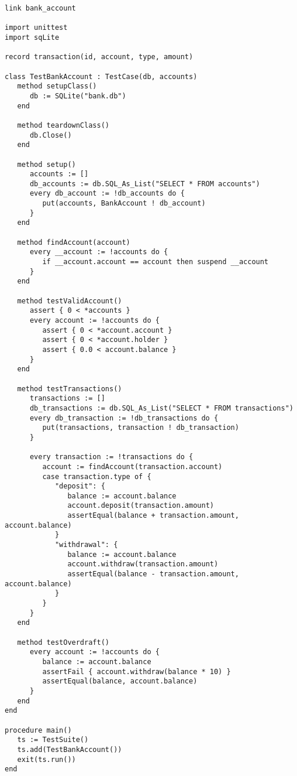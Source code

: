 \documentclass[letterpaper,12pt]{article}
\begin{document}
\bigskip{}
\begin{verbatim}
link bank_account

import unittest
import sqLite

record transaction(id, account, type, amount)

class TestBankAccount : TestCase(db, accounts)
   method setupClass()
      db := SQLite("bank.db")
   end

   method teardownClass()
      db.Close()
   end

   method setup()
      accounts := []
      db_accounts := db.SQL_As_List("SELECT * FROM accounts")
      every db_account := !db_accounts do {
         put(accounts, BankAccount ! db_account)
      }
   end

   method findAccount(account)
      every __account := !accounts do {
         if __account.account == account then suspend __account
      }
   end

   method testValidAccount()
      assert { 0 < *accounts }
      every account := !accounts do {
         assert { 0 < *account.account }
         assert { 0 < *account.holder }
         assert { 0.0 < account.balance }
      }
   end

   method testTransactions()
      transactions := []
      db_transactions := db.SQL_As_List("SELECT * FROM transactions")
      every db_transaction := !db_transactions do {
         put(transactions, transaction ! db_transaction)
      }

      every transaction := !transactions do {
         account := findAccount(transaction.account)
         case transaction.type of {
            "deposit": {
               balance := account.balance
               account.deposit(transaction.amount)
               assertEqual(balance + transaction.amount, account.balance)
            }
            "withdrawal": {
               balance := account.balance
               account.withdraw(transaction.amount)
               assertEqual(balance - transaction.amount, account.balance)
            }
         }
      }
   end

   method testOverdraft()
      every account := !accounts do {
         balance := account.balance
         assertFail { account.withdraw(balance * 10) }
         assertEqual(balance, account.balance)
      }
   end
end

procedure main()
   ts := TestSuite()
   ts.add(TestBankAccount())
   exit(ts.run())
end
\end{verbatim}
\end{document}
